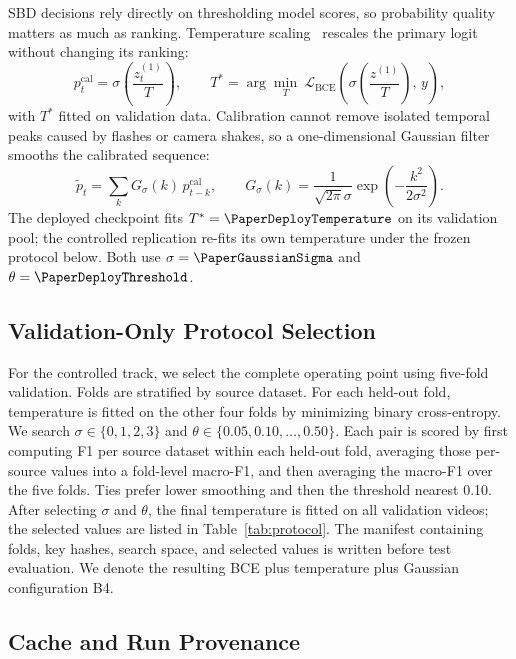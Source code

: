 SBD decisions rely directly on thresholding model scores, so probability
quality matters as much as ranking. Temperature
scaling~\cite{guo2017calibration} rescales the primary logit without
changing its ranking:
\begin{equation}
    p^{\mathrm{cal}}_t=\sigma\!\left(\frac{z^{(1)}_t}{T}\right),\qquad
    T^{*}=\arg\min_{T}\ \mathcal{L}_{\mathrm{BCE}}\!\left(\sigma\!\left(\frac{z^{(1)}}{T}\right),\,y\right),
    \label{eq:temperature}
\end{equation}
with $T^{*}$ fitted on validation data. Calibration cannot remove isolated
temporal peaks caused by flashes or camera shakes, so a one-dimensional
Gaussian filter smooths the calibrated sequence:
\begin{equation}
    \tilde p_t=\sum_k G_{\sigma}(k)\,p^{\mathrm{cal}}_{t-k},\qquad
    G_{\sigma}(k)=\frac{1}{\sqrt{2\pi}\sigma}\exp\!\left(-\frac{k^2}{2\sigma^2}\right).
    \label{eq:gaussian}
\end{equation}
The deployed checkpoint fits $T^{*}=\PaperDeployTemperature$ on its
validation pool; the controlled replication re-fits its own temperature
under the frozen protocol below. Both use $\sigma=\PaperGaussianSigma$ and
$\theta=\PaperDeployThreshold$.

\subsection{Validation-Only Protocol Selection}
\label{sec:protocol}

For the controlled track, we select the complete operating point using
five-fold validation. Folds are stratified by source dataset. For each
held-out fold, temperature is fitted on the other four folds by minimizing
binary cross-entropy. We search $\sigma\in\{0,1,2,3\}$ and
$\theta\in\{0.05,0.10,\ldots,0.50\}$. Each pair is scored by first computing
F1 per source dataset within each held-out fold, averaging those per-source
values into a fold-level macro-F1, and then averaging the macro-F1 over the
five folds. Ties prefer lower smoothing and then the threshold nearest 0.10.
After selecting $\sigma$ and $\theta$, the final temperature is fitted on
all validation videos; the selected values are listed in
Table~\ref{tab:protocol}. The manifest containing folds, key hashes, search
space, and selected values is written before test evaluation. We denote the
resulting BCE plus temperature plus Gaussian configuration B4.

\subsection{Cache and Run Provenance}

